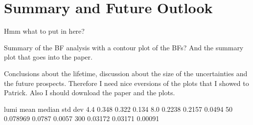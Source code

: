 \chapter{Summary and Future Outlook}

Hmm what to put in here?

Summary of the BF analysis with a contour plot of the BFs? And the summary plot that goes into the paper.

Conclusions about the lifetime, discussion about the size of the uncertainties and the future prospects. Therefore I need nice eversions of the plots that I showed to Patrick. Also I should download the paper and the plots.


lumi    mean    median    std dev
4.4     0.348   0.322     0.134
8.0     0.2238  0.2157    0.0494
50      0.078969 0.0787 0.0057
300    0.03172   0.03171 0.00091
